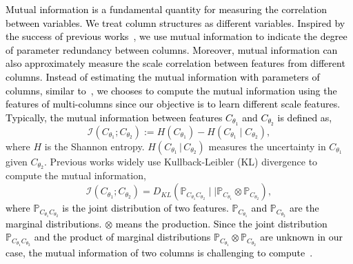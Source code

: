 \documentclass[sigconf]{acmart}
\newcommand{\czq}[1]{\textcolor{black}{#1}}
\newcommand{\beq}{\begin{equation}}
\newcommand{\eeq}{\end{equation}}
\newcommand{\PP}{\mathbb{P}}
\newcommand{\II}{\mathcal{I}}
\newcommand{\KL}[2]{D_{KL}(#1\mid\mid#2)}
\newcommand{\PJ}[2]{\mathbb{P}_{#1#2}}  %
\newcommand{\PI}[2]{\mathbb{P}_{#1}\otimes\mathbb{P}_{#2}}  %
\begin{document}
\czq{Mutual information is a fundamental quantity for measuring the correlation between variables.
We treat column structures as different variables.
Inspired by the success of previous works~\cite{mr1,mr2}, we use mutual information to indicate the degree of parameter redundancy between columns.
Moreover, mutual information can also approximately measure the scale correlation between features from different columns.
Instead of estimating the mutual information with parameters of columns, similar to~\cite{mr4,ICMR-17,MI-use-18}, we chooses to compute the mutual information using the features of multi-columns since our objective is to learn different scale features.
Typically, the mutual information between features $C_{\theta_1}$ and $C_{\theta_2}$ is defined as,}
\beq
\label{eq:im-definition}
\II(C_{\theta_1};C_{\theta_2}) := H(C_{\theta_1}) - H(C_{\theta_1} \mid C_{\theta_2}),
\eeq
where $H$ is the Shannon entropy.
$H(C_{\theta_1}\, |\, C_{\theta_2})$ measures the uncertainty in $C_{\theta_1}$ given $C_ {\theta_2}$.
Previous works \cite{mr1,mr2,mr3,mr4} widely use Kullback-Leibler (KL) divergence to compute the mutual information,
\beq 
\label{eq:kl-mi}
\II(C_{\theta_1};C_{\theta_2}) = \KL{\PJ{C_{\theta_1}}{C_{\theta_2}}}{\PI{C_{\theta_1}}{C_{\theta_2}}},
\eeq
\czq{where $\PJ{C_{\theta_1}}{C_{\theta_2}}$ is the joint distribution of two features.
$\PP_{ C_{\theta_1}}$ and $\PP_{ C_{\theta_2}}$ are the marginal distributions.
$\otimes$ means the production.
Since the joint distribution $\PJ{C_{\theta_1}}{C_{\theta_2}}$ and the product of marginal distributions $\PI{C_{\theta_1}}{C_{\theta_2}}$ are unknown in our case, the mutual information of two columns is challenging to compute~\cite{mutual-information-difficult-03}.}
\end{document}
